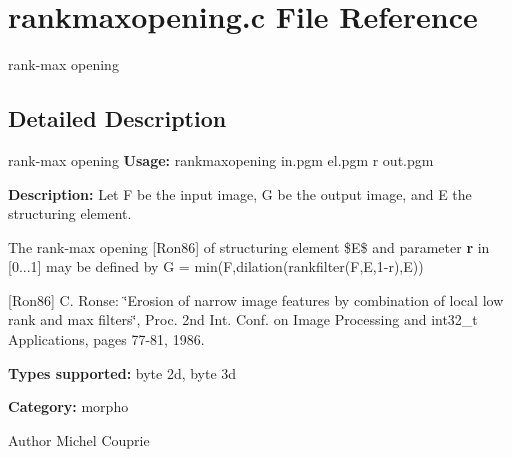 \section{rankmaxopening.c File Reference}
\label{rankmaxopening_8c}


rank-\/max opening  




\subsection{Detailed Description}
rank-\/max opening {\bfseries Usage:} rankmaxopening in.pgm el.pgm r out.pgm

{\bfseries Description:} Let F be the input image, G be the output image, and E the structuring element.

The rank-\/max opening [Ron86] of structuring element \$E\$ and parameter {\bfseries r} in [0...1] may be defined by G = min(F,dilation(rankfilter(F,E,1-\/r),E))

[Ron86] C. Ronse: \char`\"{}Erosion of narrow image features by combination of local low rank and max filters\char`\"{}, Proc. 2nd Int. Conf. on Image Processing and int32\_\-t Applications, pages 77-\/81, 1986.

{\bfseries Types supported:} byte 2d, byte 3d

{\bfseries Category:} morpho

\begin{DoxyAuthor}{Author}
Michel Couprie 
\end{DoxyAuthor}
